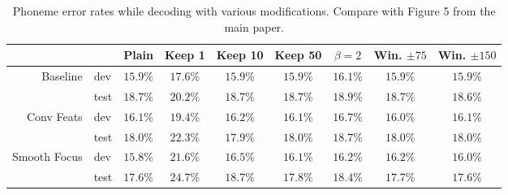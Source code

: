 \documentclass{article}
\begin{document}
\begin{table}[h]
  \centering
  \caption{Phoneme error rates while decoding with various
    modifications. Compare with Figure 5 from the main paper.}
\setlength\tabcolsep{5pt}
\begin{tabular}{rl|c|c|c|c|c|c|c}
             &         &   Plain  &  Keep 1  & Keep 10  & Keep 50  &
             $\beta=2$ & Win. $\pm 75$ & Win. $\pm 150$ \\ \hline \hline
\multirow{2}{*}{Baseline} &     dev & $15.9\%$ & $17.6\%$ & $15.9\%$ & $15.9\%$ &   $16.1\%$ &       $15.9\%$ &        $15.9\%$ \\
             &    test & $18.7\%$ & $20.2\%$ & $18.7\%$ & $18.7\%$ &
             $18.9\%$ &       $18.7\%$ &        $18.6\%$ \\ \hline
\multirow{2}{*}{Conv Feats} &     dev & $16.1\%$ & $19.4\%$ & $16.2\%$ & $16.1\%$ &   $16.7\%$ &       $16.0\%$ &        $16.1\%$ \\
             &    test & $18.0\%$ & $22.3\%$ & $17.9\%$ & $18.0\%$ &
             $18.7\%$ &       $18.0\%$ &        $18.0\%$ \\ \hline
\multirow{2}{*}{Smooth Focus} &     dev & $15.8\%$ & $21.6\%$ & $16.5\%$ & $16.1\%$ &   $16.2\%$ &       $16.2\%$ &        $16.0\%$ \\
             &    test & $17.6\%$ & $24.7\%$ & $18.7\%$ & $17.8\%$ &   $18.4\%$ &       $17.7\%$ &        $17.6\%$ \\
\end{tabular}
  \label{tab:decoding_singles}
\end{table}


 
\end{document}
